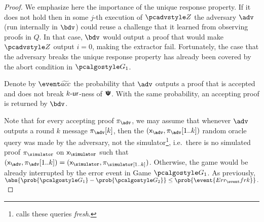 \begin{proof}
{  We emphasize here the importance of the unique response property. If it does not
  hold then in some $j$-th execution of $\zdv$ the adversary $\adv$ (run internally
  in $\bdv$) could reuse a challenge that it learned from observing proofs in $Q$. In
  that case, $\bdv$ would output a proof that would make $\zdv$ output $i = 0$,
  making the extractor fail. Fortunately, the case that the adversary breaks the
  unique response property has already been covered by the abort condition in
  $\game{1}$.
		
  Denote by $\waccProb$ the probability that $\advse$ outputs a proof that is 
  accepted and does not break ${k\text{-}\mathsf{ur}}$-ness of $\bm{\mathsf{\Psi}}$. With the same probability, an
  accepting proof is returned by $\bdv$.}
	
		Note that for every accepting proof $\zkproof_{\advse}$, we may
		assume that whenever $\advse$ outputs a round $k$ message $\zkproof_{\advse}[k]$, then the
		$(\inp_{\advse}, \zkproof_{\advse}[1..k])$ random oracle query was made by the adversary, not
		the simulator\footnote{\cite{INDOCRYPT:FKMV12} calls these queries \emph{fresh}.}, i.e.~there
		is no simulated proof $\zkproof_\simulator$ on $\inp_\simulator$ such that
		$(\inp_{\advse}, \zkproof_{\advse} [1..k]) = (\inp_\simulator,
		\zkproof_\simulator[1..k])$. Otherwise, the game would be already interrupted by the error
		event in Game $\game{1}$.  As previously,
		\( \abs{\prob{\game{1}} - \prob{\game{2}}} \leq \prob{\event{\errfrk}}\,.  \)
		
\end{proof}
